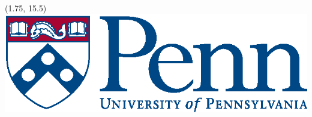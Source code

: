 \documentclass[12pt, final]{beamer}
\begin{document}
\begin{frame}[t]
  \begin{textblock}{10}(1.75, 15.5)
   \includegraphics[scale=2]{penn}
  \end{textblock}

\end{frame}
\end{document}
